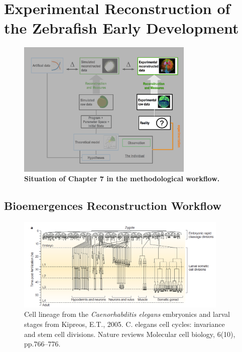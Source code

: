 

\section{Experimental Reconstruction of the Zebrafish Early Development }
\begin{figure}
\begin{center}
\includegraphics[width=0.75\textwidth]{../../images/experimental_science/experimental_science_cleaner_focus_reconstruction_live.png}
\end{center}
\caption{\textbf{Situation of Chapter 7 in the methodological workflow.}}
\label{experimental_science_experimental_science_cleaner_focus_reconstruction_live}
\end{figure}

\subsection{Bioemergences Reconstruction Workflow  }
\begin{figure}
\begin{center}
\includegraphics[width=0.9\textwidth]{../../images/Reconstruction/bioemergences/c_elegans_lineage_kipreos_2005.png}
\end{center}
\caption{Cell lineage from the \textit{Caenorhabditis elegans} embryonics and larval stages from Kipreos, E.T., 2005. C. elegans cell cycles: invariance and stem cell divisions. Nature reviews Molecular cell biology, 6(10), pp.766–776. \cite{Kipreos:2005im}}
\label{bioemergences_c_elegans_lineage_kipreos_2005}
\end{figure}

